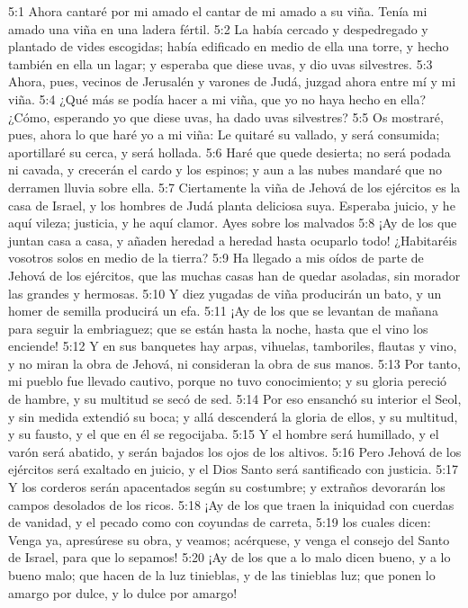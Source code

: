 5:1 Ahora cantaré por mi amado el cantar de mi amado a su viña. Tenía mi amado una viña en una ladera fértil. 
5:2 La había cercado y despedregado y plantado de vides escogidas; había edificado en medio de ella una torre, y hecho también en ella un lagar; y esperaba que diese uvas, y dio uvas silvestres. 
5:3 Ahora, pues, vecinos de Jerusalén y varones de Judá, juzgad ahora entre mí y mi viña. 
5:4 ¿Qué más se podía hacer a mi viña, que yo no haya hecho en ella? ¿Cómo, esperando yo que diese uvas, ha dado uvas silvestres? 
5:5 Os mostraré, pues, ahora lo que haré yo a mi viña: Le quitaré su vallado, y será consumida; aportillaré su cerca, y será hollada. 
5:6 Haré que quede desierta; no será podada ni cavada, y crecerán el cardo y los espinos; y aun a las nubes mandaré que no derramen lluvia sobre ella. 
5:7 Ciertamente la viña de Jehová de los ejércitos es la casa de Israel, y los hombres de Judá planta deliciosa suya. Esperaba juicio, y he aquí vileza; justicia, y he aquí clamor. 
Ayes sobre los malvados 
5:8 ¡Ay de los que juntan casa a casa, y añaden heredad a heredad hasta ocuparlo todo! ¿Habitaréis vosotros solos en medio de la tierra? 
5:9 Ha llegado a mis oídos de parte de Jehová de los ejércitos, que las muchas casas han de quedar asoladas, sin morador las grandes y hermosas. 
5:10 Y diez yugadas de viña producirán un bato, y un homer de semilla producirá un efa. 
5:11 ¡Ay de los que se levantan de mañana para seguir la embriaguez; que se están hasta la noche, hasta que el vino los enciende! 
5:12 Y en sus banquetes hay arpas, vihuelas, tamboriles, flautas y vino, y no miran la obra de Jehová, ni consideran la obra de sus manos. 
5:13 Por tanto, mi pueblo fue llevado cautivo, porque no tuvo conocimiento; y su gloria pereció de hambre, y su multitud se secó de sed. 
5:14 Por eso ensanchó su interior el Seol, y sin medida extendió su boca; y allá descenderá la gloria de ellos, y su multitud, y su fausto, y el que en él se regocijaba. 
5:15 Y el hombre será humillado, y el varón será abatido, y serán bajados los ojos de los altivos. 
5:16 Pero Jehová de los ejércitos será exaltado en juicio, y el Dios Santo será santificado con justicia. 
5:17 Y los corderos serán apacentados según su costumbre; y extraños devorarán los campos desolados de los ricos. 
5:18 ¡Ay de los que traen la iniquidad con cuerdas de vanidad, y el pecado como con coyundas de carreta, 
5:19 los cuales dicen: Venga ya, apresúrese su obra, y veamos; acérquese, y venga el consejo del Santo de Israel, para que lo sepamos! 
5:20 ¡Ay de los que a lo malo dicen bueno, y a lo bueno malo; que hacen de la luz tinieblas, y de las tinieblas luz; que ponen lo amargo por dulce, y lo dulce por amargo! 
